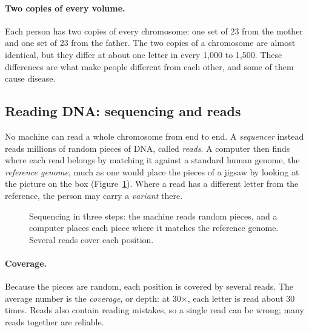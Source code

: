 \documentclass[11pt]{article}
\begin{document}
\paragraph{Two copies of every volume.} Each person has two copies of every
chromosome: one set of 23 from the mother and one set of 23 from the father.
The two copies of a chromosome are almost identical, but they differ at
about one letter in every 1{,}000 to 1{,}500. These differences are what
make people different from each other, and some of them cause disease.

\subsection{Reading DNA: sequencing and reads}

No machine can read a whole chromosome from end to end. A
\emph{sequencer} instead reads millions of random pieces of DNA, called
\emph{reads}. A computer then finds where each read belongs by matching it
against a standard human genome, the \emph{reference genome}, much as one
would place the pieces of a jigsaw by looking at the picture on the box
(Figure~\ref{fig:sequencing}). Where a read has a different letter from the
reference, the person may carry a \emph{variant} there.

\begin{figure}[h]
\centering
{}
\caption{Sequencing in three steps: the machine reads random pieces, and a
computer places each piece where it matches the reference genome. Several
reads cover each position.}
\label{fig:sequencing}
\end{figure}

\paragraph{Coverage.} Because the pieces are random, each position is
covered by several reads. The average number is the \emph{coverage}, or
depth: at 30$\times$, each letter is read about 30 times. Reads also contain
reading mistakes, so a single read can be wrong; many reads together are
reliable.
\end{document}
